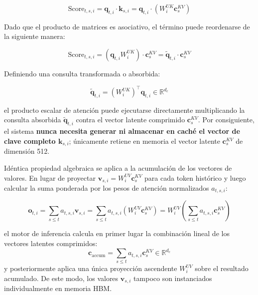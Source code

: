\begin{equation}
\mathrm{Score}_{t,s,i} = \mathbf{q}_{t,i} \cdot \mathbf{k}_{s,i} = \mathbf{q}_{t,i} \cdot \left( W^{UK}_i \mathbf{c}_s^{KV} \right)
\end{equation}

Dado que el producto de matrices es asociativo, el término puede reordenarse de la siguiente manera:

\begin{equation}
\mathrm{Score}_{t,s,i} = ( \mathbf{q}_{t,i} W^{UK}_i ) \cdot \mathbf{c}_s^{KV} = \tilde{\mathbf{q}}_{t,i} \cdot \mathbf{c}_s^{KV}
\end{equation}

Definiendo una consulta transformada o absorbida:

\begin{equation}
\tilde{\mathbf{q}}_{t,i} = (W^{UK}_i)^\top \mathbf{q}_{t,i} \in \mathbb{R}^{d_c}
\end{equation}

el producto escalar de atención puede ejecutarse directamente multiplicando la consulta absorbida $\tilde{\mathbf{q}}_{t,i}$ contra el vector latente comprimido $\mathbf{c}_s^{KV}$. Por consiguiente, el sistema \textbf{nunca necesita generar ni almacenar en caché el vector de clave completo $\mathbf{k}_{s,i}$}; únicamente retiene en memoria el vector latente $\mathbf{c}_s^{KV}$ de dimensión 512.

Idéntica propiedad algebraica se aplica a la acumulación de los vectores de valores. En lugar de proyectar $\mathbf{v}_{s,i} = W^{UV}_i \mathbf{c}_s^{KV}$ para cada token histórico y luego calcular la suma ponderada por los pesos de atención normalizados $a_{t,s,i}$:

\begin{equation}
\mathbf{o}_{t,i} = \sum_{s \le t} a_{t,s,i} \mathbf{v}_{s,i} = \sum_{s \le t} a_{t,s,i} \left( W^{UV}_i \mathbf{c}_s^{KV} \right) = W^{UV}_i \left( \sum_{s \le t} a_{t,s,i} \mathbf{c}_s^{KV} \right)
\end{equation}

el motor de inferencia calcula en primer lugar la combinación lineal de los vectores latentes comprimidos:
\begin{equation}
\mathbf{c}_{\text{accum}} = \sum_{s \le t} a_{t,s,i} \mathbf{c}_s^{KV} \in \mathbb{R}^{d_c}
\end{equation}
y posteriormente aplica una única proyección ascendente $W^{UV}_i$ sobre el resultado acumulado. De este modo, los valores $\mathbf{v}_{s,i}$ tampoco son instanciados individualmente en memoria HBM.

